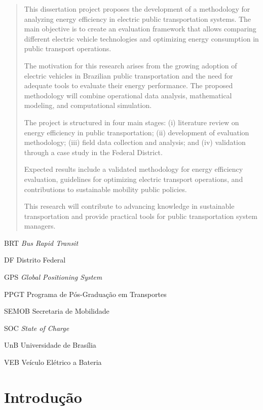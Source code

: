 \documentclass[qualificacao-mestrado,onehalfspacing,12pt,hyperref]{UnB-PPGT}
\begin{document}
\begin{abstract}
This dissertation project proposes the development of a methodology for analyzing energy efficiency in electric public transportation systems. The main objective is to create an evaluation framework that allows comparing different electric vehicle technologies and optimizing energy consumption in public transport operations.

The motivation for this research arises from the growing adoption of electric vehicles in Brazilian public transportation and the need for adequate tools to evaluate their energy performance. The proposed methodology will combine operational data analysis, mathematical modeling, and computational simulation.

The project is structured in four main stages: (i) literature review on energy efficiency in public transportation; (ii) development of evaluation methodology; (iii) field data collection and analysis; and (iv) validation through a case study in the Federal District.

Expected results include a validated methodology for energy efficiency evaluation, guidelines for optimizing electric transport operations, and contributions to sustainable mobility public policies.

This research will contribute to advancing knowledge in sustainable transportation and provide practical tools for public transportation system managers.
\end{abstract}

\begin{siglas}
\item[BRT] \textit{Bus Rapid Transit}
\item[DF] Distrito Federal
\item[GPS] \textit{Global Positioning System}
\item[PPGT] Programa de Pós-Graduação em Transportes
\item[SEMOB] Secretaria de Mobilidade
\item[SOC] \textit{State of Charge}
\item[UnB] Universidade de Brasília
\item[VEB] Veículo Elétrico a Bateria
\end{siglas}

\textual

\chapter{Introdução}
\label{cap:introducao}
\end{document}
